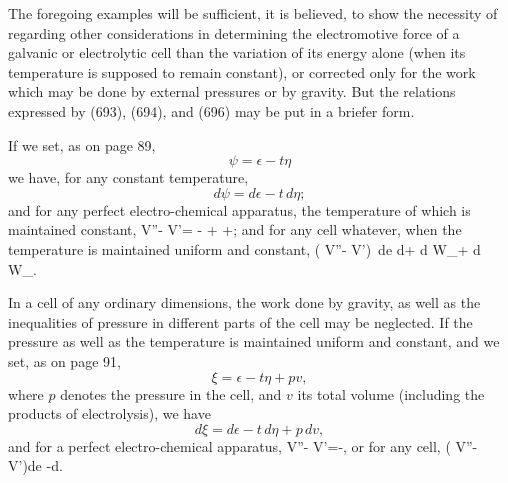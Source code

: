 \documentclass[12pt]{memoir}
\begin{document}
The foregoing examples will be sufficient, it is believed, to show the necessity of regarding other considerations in determining the electromotive force of a galvanic or electrolytic cell than the variation of its energy alone (when its temperature is supposed to remain constant), or corrected only for the work which may be done by external pressures or by gravity. But the relations expressed by (693), (694), and (696) may be put in a briefer form.

If we set, as on page 89,
$$ \psi = \epsilon -t\eta $$
we have, for any constant temperature,
$$ d\psi = d\epsilon - t \, d\eta ;$$
and for any perfect electro-chemical apparatus, the temperature of which is maintained constant,
\eqs V''- V'= - +  +; \label{697} \eqe
and for any cell whatever, when the temperature is maintained uniform and constant,
\eqs ( V''- V')\, de \leq d\psi + d W_+ d W_.  \label{698} \eqe

In a cell of any ordinary dimensions, the work done by gravity, as well as the inequalities of pressure in different parts of the cell may be neglected. If the pressure as well as the temperature is maintained uniform and constant, and we set, as on page 91,
$$ \xi=\epsilon-t\eta +pv,$$
where $p$ denotes the pressure in the cell, and $v$ its total volume (including the products of electrolysis), we have
$$ d\xi=d\epsilon-t\,d\eta +p\, dv,$$
and for a perfect electro-chemical apparatus,
\eqs V''- V'=-,   \label{699} \eqe
or for any cell,
\eqs ( V''- V')de \leq -d\xi.    \label{700} \eqe
\end{document}
